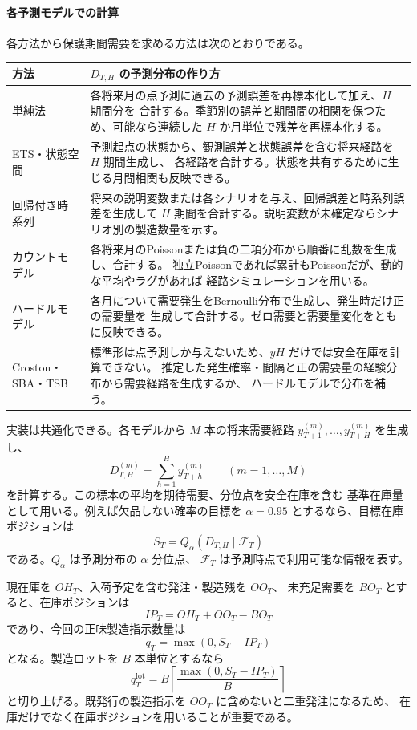 \documentclass[a4paper,11pt]{jsarticle}
\begin{document}
\paragraph{各予測モデルでの計算}
各方法から保護期間需要を求める方法は次のとおりである。
\begin{center}
\begin{tabular}{>{\raggedright\arraybackslash}p{30mm}
                >{\raggedright\arraybackslash}p{102mm}}
\toprule
方法 & $D_{T,H}$ の予測分布の作り方\\
\midrule
単純法 &
各将来月の点予測に過去の予測誤差を再標本化して加え、$H$ 期間分を
合計する。季節別の誤差と期間間の相関を保つため、可能なら連続した
$H$ か月単位で残差を再標本化する。\\
ETS・状態空間 &
予測起点の状態から、観測誤差と状態誤差を含む将来経路を $H$ 期間生成し、
各経路を合計する。状態を共有するために生じる月間相関も反映できる。\\
回帰付き時系列 &
将来の説明変数または各シナリオを与え、回帰誤差と時系列誤差を生成して
$H$ 期間を合計する。説明変数が未確定ならシナリオ別の製造数量を示す。\\
カウントモデル &
各将来月のPoissonまたは負の二項分布から順番に乱数を生成し、合計する。
独立Poissonであれば累計もPoissonだが、動的な平均やラグがあれば
経路シミュレーションを用いる。\\
ハードルモデル &
各月について需要発生をBernoulli分布で生成し、発生時だけ正の需要量を
生成して合計する。ゼロ需要と需要量変化をともに反映できる。\\
Croston・SBA・TSB &
標準形は点予測しか与えないため、$\hat y H$ だけでは安全在庫を計算できない。
推定した発生確率・間隔と正の需要量の経験分布から需要経路を生成するか、
ハードルモデルで分布を補う。\\
\bottomrule
\end{tabular}
\end{center}

実装は共通化できる。各モデルから $M$ 本の将来需要経路
$y_{T+1}^{(m)},\ldots,y_{T+H}^{(m)}$ を生成し、
\[
D_{T,H}^{(m)}=\sum_{h=1}^{H}y_{T+h}^{(m)}
\qquad(m=1,\ldots,M)
\]
を計算する。この標本の平均を期待需要、分位点を安全在庫を含む
基準在庫量として用いる。例えば欠品しない確率の目標を
$\alpha=0.95$ とするなら、目標在庫ポジションは
\[
S_T=Q_\alpha(D_{T,H}\mid\mathcal{F}_T)
\]
である。$Q_\alpha$ は予測分布の $\alpha$ 分位点、
$\mathcal{F}_T$ は予測時点で利用可能な情報を表す。

現在庫を $OH_T$、入荷予定を含む発注・製造残を $OO_T$、
未充足需要を $BO_T$ とすると、在庫ポジションは
\[
IP_T=OH_T+OO_T-BO_T
\]
であり、今回の正味製造指示数量は
\[
q_T=\max(0,S_T-IP_T)
\]
となる。製造ロットを $B$ 本単位とするなら
\[
q_T^{\mathrm{lot}}
=B\left\lceil\frac{\max(0,S_T-IP_T)}{B}\right\rceil
\]
と切り上げる。既発行の製造指示を $OO_T$ に含めないと二重発注になるため、
在庫だけでなく在庫ポジションを用いることが重要である。
\end{document}
